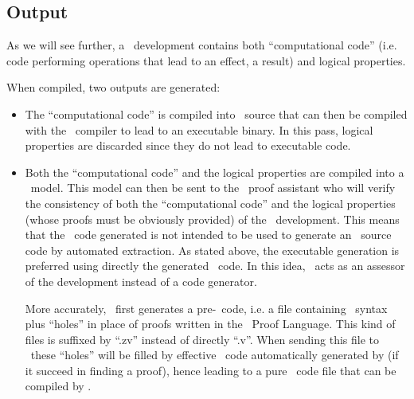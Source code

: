 


\subsection{Output}
As we will see further, a \focal\ development contains both
``computational code'' (i.e. code performing operations that lead to
an effect, a result) and logical properties.

\smallskip
When compiled, two outputs are generated:
\begin{itemize}
  \item The ``computational code'' is compiled into \ocaml\ source
    that can then be compiled with the \ocaml\ compiler to lead to an
    executable binary. In this pass, logical properties are discarded
    since they do not lead to executable code.
  \item Both the ``computational code'' and the logical properties are
    compiled into a \coq\ model. This model can then be sent to the
    \coq\ proof assistant who will verify the consistency of both the
    ``computational code'' and the logical properties (whose
    proofs must be obviously provided) of the
    \focal\ development. This means that the \coq\ code generated is
    not intended to be used to generate an \ocaml\ source code by
    automated extraction. As stated above, the executable generation
    is preferred using directly the generated \ocaml\ code. In this
    idea, \coq\ acts as an assessor of the development instead of a
    code generator.

    More accurately, \focal\ first generates a pre-\coq\ code, i.e. a
    file containing \coq\ syntax plus ``holes'' in place of proofs
    written in the \focal\ Proof Language. This kind of files is
    suffixed by ``.zv'' instead of directly ``.v''. When sending this
    file to \zenon\ these ``holes'' will be filled by effective
    \coq\ code automatically generated by \zenon (if it succeed in
    finding a proof), hence leading to a pure \coq\ code file that can
    be compiled by \coq.
\end{itemize}



